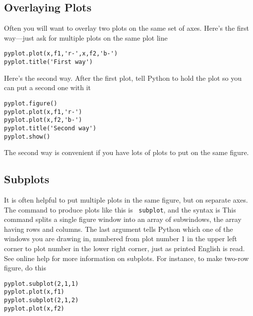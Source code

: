 \subsection*{Overlaying Plots}
  Often you will want to
overlay two plots on the same set of axes.
Here's the first way---just ask for multiple plots on the
same plot line
\begin{Verbatim}
pyplot.plot(x,f1,'r-',x,f2,'b-')
pyplot.title('First way')
\end{Verbatim}
Here's the second way. After the first plot, tell Python
to hold the plot so you can put a second one with it
\begin{Verbatim}
pyplot.figure()
pyplot.plot(x,f1,'r-')
pyplot.plot(x,f2,'b-')
pyplot.title('Second way')
pyplot.show()
\end{Verbatim}
The second way is convenient if you have lots of plots to put on
the same figure.

\subsection*{Subplots}

It is often helpful to put multiple plots in the same figure, but
on separate axes. The command to produce plots like this is {\tt
subplot}, and the syntax is  This command splits a single figure window into an array
of subwindows, the array having  rows and 
columns. The last argument tells Python which one of the windows
you are drawing in, numbered from plot number 1 in the upper left
corner to plot number  in the lower right corner,
just as printed English is read. See online help for more
information on subplots.  For instance, to make two-row figure, do
this
\begin{Verbatim}
pyplot.subplot(2,1,1)
pyplot.plot(x,f1)
pyplot.subplot(2,1,2)
pyplot.plot(x,f2)
\end{Verbatim}



